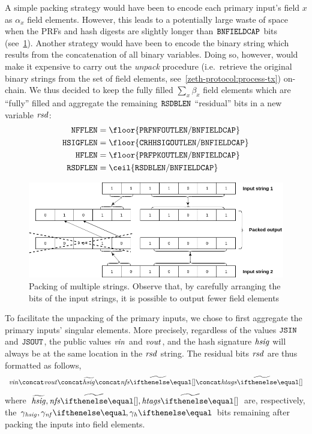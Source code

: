 A simple packing strategy would have been to encode each primary input's field $x$ as $\alpha_x$ field elements. However, this leads to a potentially large waste of space when the PRFs and hash digests are slightly longer than $\mathtt{BNFIELDCAP}$ bits (see~\cref{instantiation:fig:packing-multi-strings}). Another strategy would have been to encode the binary string which results from the concatenation of all binary variables. Doing so, however, would make it expensive to carry out the \emph{unpack} procedure (i.e.~retrieve the original binary strings from the set of field elements, see~\cref{zeth-protocol:process-tx}) on-chain. We thus decided to keep the fully filled $\sum_x \beta_x$ field elements which are ``fully'' filled and aggregate the remaining $\mathtt{RSDBLEN}$ ``residual'' bits in a new variable $\mathit{rsd}$:
\begin{align*}
    \nfFLen &= \floor{\prfNfOutLen / \bnFieldBitCap} \\
    \hsigFLen &= \floor{\crhhsigOutLen / \bnFieldBitCap} \\
    \htagFLen &= \floor{\prfPkOutLen / \bnFieldBitCap} \\
    \resBitsFLen &= \ceil{\resBitsBLen / \bnFieldBitCap}
\end{align*}

\begin{figure}[ht]
    \centering
    \includegraphics[width=1\textwidth]{images/bit-packing-multi-strings.png}
    \caption{Packing of multiple strings. Observe that, by carefully arranging the bits of the input strings, it is possible to output fewer field elements}\label{instantiation:fig:packing-multi-strings}
\end{figure}

To facilitate the unpacking of the primary inputs, we chose to first aggregate the primary inputs' singular elements. More precisely, regardless of the values $\mathtt{JSIN}$ and $\mathtt{JSOUT}$, the public values $\mathit{vin}$ and $\mathit{vout}$, and the hash signature $\mathit{hsig}$ will always be at the same location in the $\mathit{rsd}$ string. The residual bits $\mathit{rsd}$ are thus formatted as follows,
\[
    \vin \concat \vout \concat \widetilde{\hsig} \concat \widetilde{\nfs{}} \concat \widetilde{\htags{}}
\]
where $\widetilde{\hsig}, \widetilde{\nfs{}}, \widetilde{\htags{}}$ are, respectively, the $\gamma_\hsig, \gamma_\nf{}, \gamma_\htag{}$ bits remaining after packing the inputs into field elements.

